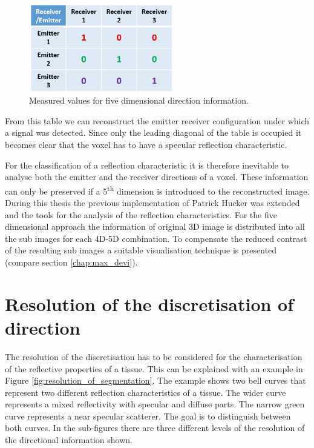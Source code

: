 \begin{figure}[H]
    \centering
    \includegraphics[width=0.56\textwidth]{Graphics/Diskussion/4D_not_enough_table.png}
    \caption{Measured values for five dimensional direction information.}
    \label{table_1}
\end{figure}

From this table we can reconstruct the emitter receiver configuration under which a signal was detected. Since only the leading diagonal of the table is occupied it becomes clear that the voxel has to have a specular reflection characteristic. 

\bigskip


For the classification of a reflection characteristic it is therefore inevitable to analyse both the emitter and the receiver directions of a voxel. These information can only be preserved if a 5\textsuperscript{th} dimension is introduced to the reconstructed image. During this thesis the previous implementation of Patrick Hucker was extended and the tools for the analysis of the reflection characteristics. For the five dimensional approach the information of original 3D image is distributed into all the sub images for each 4D-5D combination. To compensate the reduced contrast of the resulting sub images a suitable visualisation technique is presented (compare section \ref{chap:max_devi}). 

\newpage

\section{Resolution of the discretisation of direction}

The resolution of the discretisation has to be considered for the characterisation of the reflective properties of a tissue. This can be explained with an example in Figure \ref{fig:resolution_of_segmentation}. The example shows two bell curves that represent two different reflection characteristics of a tissue. The wider curve represents a mixed reflectivity with specular and diffuse parts. The narrow green curve represents a near specular scatterer. The goal is to distinguish between both curves. In the sub-figures there are three different levels of the resolution of the directional information shown.


